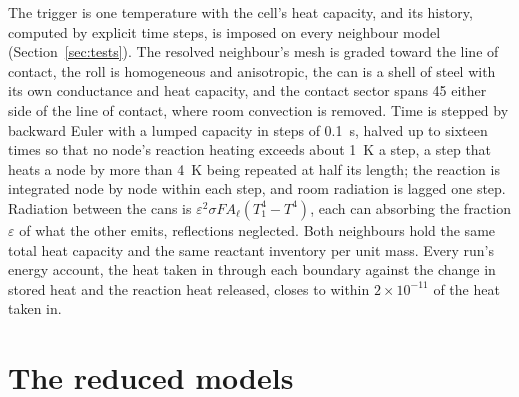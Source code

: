 \documentclass[preprint,12pt]{elsarticle}
\begin{document}
The trigger is one temperature with the cell's heat capacity, and its history, computed by explicit time steps, is imposed on every neighbour model (Section~\ref{sec:tests}). The resolved neighbour's mesh is graded toward the line of contact, the roll is homogeneous and anisotropic, the can is a shell of steel with its own conductance and heat capacity, and the contact sector spans 45\textdegree{} either side of the line of contact, where room convection is removed. Time is stepped by backward Euler with a lumped capacity in steps of 0.1~s, halved up to sixteen times so that no node's reaction heating exceeds about 1~K a step, a step that heats a node by more than 4~K being repeated at half its length; the reaction is integrated node by node within each step, and room radiation is lagged one step. Radiation between the cans is $\varepsilon^2\sigma F A_\ell(T_1^4-T^4)$, each can absorbing the fraction $\varepsilon$ of what the other emits, reflections neglected. Both neighbours hold the same total heat capacity and the same reactant inventory per unit mass. Every run's energy account, the heat taken in through each boundary against the change in stored heat and the reaction heat released, closes to within $2\times10^{-11}$ of the heat taken in.

\section{The reduced models}
\label{app:reduced}
\end{document}
